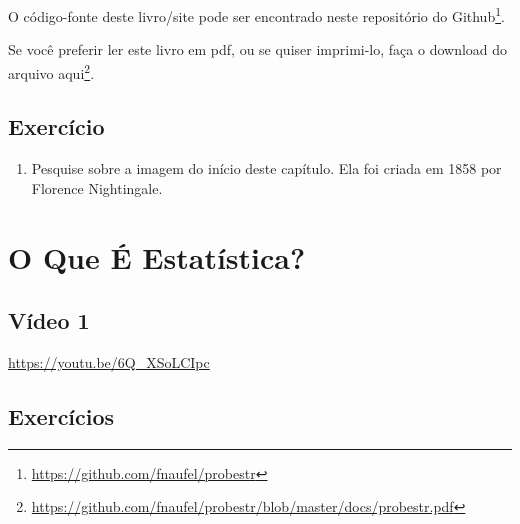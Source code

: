 \documentclass[
  12pt]{report}
\DeclareRobustCommand{\href}[2]{#2\footnote{\url{#1}}}
\providecommand{\tightlist}{%
  \setlength{\itemsep}{0pt}\setlength{\parskip}{0pt}}
\begin{document}
O código-fonte deste livro/site pode ser encontrado \href{https://github.com/fnaufel/probestr}{neste repositório do Github}.

Se você preferir ler este livro em pdf, ou se quiser imprimi-lo, \href{https://github.com/fnaufel/probestr/blob/master/docs/probestr.pdf}{faça o download do arquivo aqui}.

\hypertarget{exercuxedcio}{%
\section*{Exercício}\label{exercuxedcio}}

\begin{enumerate}
\def\labelenumi{\arabic{enumi}.}
\tightlist
\item
  Pesquise sobre a imagem do início deste capítulo. Ela foi criada em 1858 por Florence Nightingale.
\end{enumerate}

\hypertarget{oque}{%
\chapter{O Que É Estatística?}\label{oque}}

\hypertarget{vuxeddeo-1}{%
\section{Vídeo 1}\label{vuxeddeo-1}}

\begin{center} \url{https://youtu.be/6Q_XSoLCIpc} \end{center}

\hypertarget{exercuxedcios}{%
\section{Exercícios}\label{exercuxedcios}}
\end{document}
